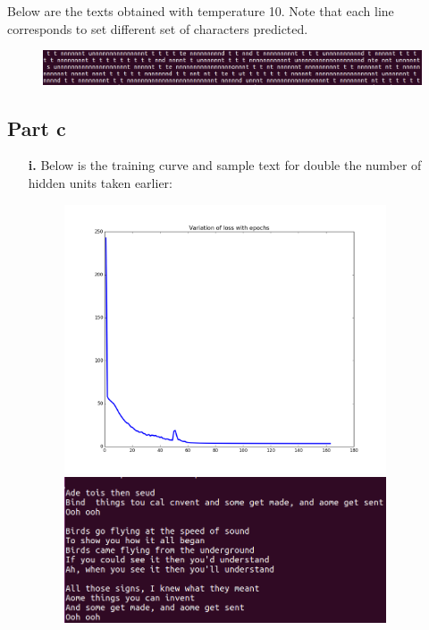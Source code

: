 \documentclass{article}
\begin{document}
\begin{flushleft}
\begin{itemize}
Below are the texts obtained with temperature 10. Note that each line corresponds to set different set of characters predicted.
\begin{figure}[H]
\centering
\includegraphics[width=0.75\linewidth]{500-10.png}
\end{figure}
\end{itemize}
\end{flushleft}

\subsection*{Part c}
\begin{flushleft}
\begin{itemize}
\item [\textbf{i.}]
Below is the training curve and sample text for double the number of hidden units taken earlier:
\begin{figure}[H]
\begin{minipage}{0.475\linewidth}
\centering
\includegraphics[width=0.9\textwidth]{RNN_training_HU2x.png}
\end{minipage}
\hfill
\begin{minipage}{0.475\linewidth}
\centering
\includegraphics[width=0.9\textwidth]{RNN_text_HU2x.png}
\end{minipage}
\end{figure}


\end{itemize}
\end{flushleft}
\end{document}
